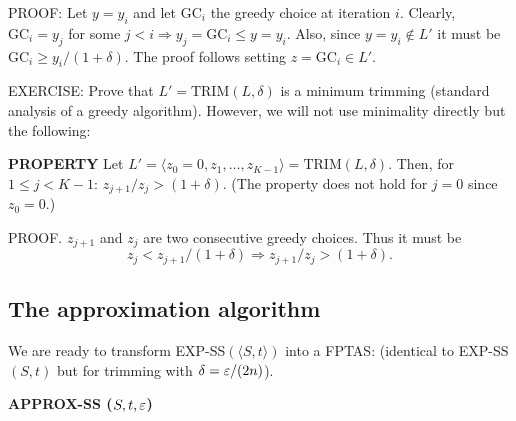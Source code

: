 PROOF: Let $y=y_i$ and let $\mathrm{GC}_i$ the greedy choice at iteration $i$. Clearly, $\mathrm{GC}_i=y_j$ for some $j<i\Rightarrow y_j=\mathrm{GC}_i\leq y=y_i$. Also, since $y=y_i\notin L'$ it must be $\mathrm{GC}_i\geq y_i/(1+\delta)$. The proof follows setting $z=\mathrm{GC}_i\in L'$.

EXERCISE: Prove that $L'=\mathrm{TRIM}(L,\delta)$ is a minimum trimming (standard analysis of a greedy algorithm).
However, we will not use minimality directly but the following:
\begin{notesresult}
\textbf{PROPERTY} Let $L'=\langle z_0=0,z_1,\ldots,z_{K-1}\rangle=\mathrm{TRIM}(L,\delta)$.
Then, for $1\leq j<K-1$: $z_{j+1}/z_j>(1+\delta)$.
(The property does not hold for $j=0$ since $z_0=0$.)
\end{notesresult}
PROOF. $z_{j+1}$ and $z_j$ are two consecutive greedy choices. Thus it must be
\[z_j<z_{j+1}/(1+\delta)\Rightarrow z_{j+1}/z_j>(1+\delta).\]
\subsection{The approximation algorithm}
We are ready to transform EXP-SS$(\langle S,t\rangle)$ into a FPTAS:
(identical to EXP-SS$(S,t)$ but for trimming with $\delta=\varepsilon/(2n)$).
\begin{notesalgorithm}
\textbf{APPROX-SS ($S,t,\varepsilon$)}
\begin{notespseudocode}
\end{notespseudocode}
\end{notesalgorithm}

